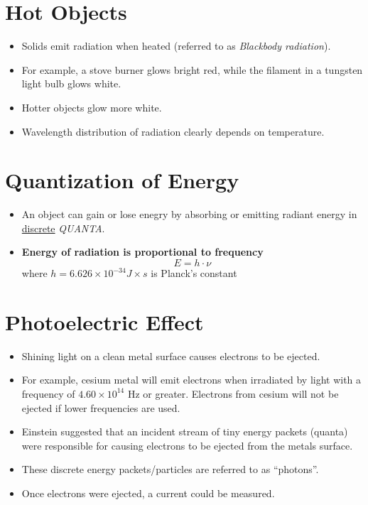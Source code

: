 \documentclass[
	chapter=7,
	title={Quantum Theory {\&} the Electronic Structure of Atoms},
	showanswers=true,
]{chem122notes}
\begin{document}
\section{Hot Objects}\label{sec:hot-objects}
\begin{itemize}
	\item Solids emit radiation when heated (referred to as \textit{Blackbody radiation}).
	\item For example, a stove burner glows bright red, while the filament in a tungsten light bulb glows white.
	\item Hotter objects glow more white.
	\item Wavelength distribution of radiation clearly depends on temperature.
\end{itemize}

\section{Quantization of Energy}\label{sec:quantization-of-energy}
\begin{itemize}
	\item An object can gain or lose enegry by absorbing or emitting radiant energy in \underline{discrete} \emph{QUANTA}.
	\item \textbf{Energy of radiation is proportional to frequency}
	\begin{equation}
		E = h \cdot \nu
		\label{eq:planck-radiation}
	\end{equation}
	where $h=6.626 \times 10^{-34} J\times s$ is Planck's constant
\end{itemize}

\section{Photoelectric Effect}\label{sec:photoelectric-effect}
\begin{itemize}
	\item Shining light on a clean metal surface causes electrons to be ejected.
	\item For example, cesium metal will emit electrons when irradiated by light with a frequency of $4.60 \times 10^{14}$ Hz or greater.
	Electrons from cesium will not be ejected if lower frequencies are used.
	\item Einstein suggested that an incident stream of tiny energy packets (quanta) were responsible for causing electrons to be ejected from the metals surface.
	\item These discrete energy packets/particles are referred to as ``photons''.
	\item Once electrons were ejected, a current could be measured.
\end{itemize}
\end{document}
